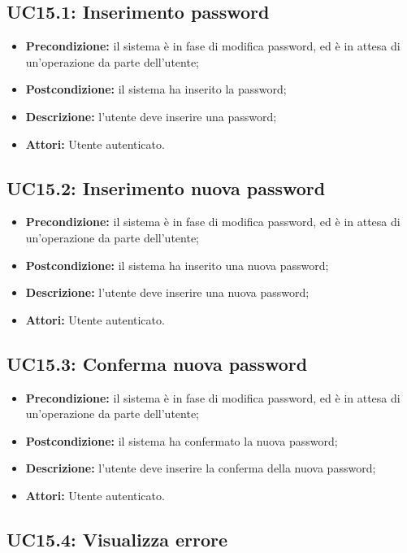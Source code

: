 \subsection{ UC15.1: Inserimento password}

\begin{itemize}
	\item \textbf{Precondizione:} il sistema è in fase di modifica password, ed è in attesa di un'operazione da parte dell'utente;
	\item \textbf{Postcondizione:} il sistema ha inserito la password;
	\item \textbf{Descrizione:} l'utente deve inserire una password;
	\item \textbf{Attori:} Utente autenticato.
\end{itemize}
\subsection{ UC15.2: Inserimento nuova password}

\begin{itemize}
	\item \textbf{Precondizione:} il sistema è in fase di modifica password, ed è in attesa di un'operazione da parte dell'utente;
	\item \textbf{Postcondizione:} il sistema ha inserito una nuova password;
	\item \textbf{Descrizione:} l'utente deve inserire una nuova password;
	\item \textbf{Attori:} Utente autenticato.
\end{itemize}
\subsection{ UC15.3: Conferma nuova password}

\begin{itemize}
	\item \textbf{Precondizione:} il sistema è in fase di modifica password, ed è in attesa di un'operazione da parte dell'utente;
	\item \textbf{Postcondizione:} il sistema ha confermato la nuova password;
	\item \textbf{Descrizione:} l'utente deve inserire la conferma della nuova password;
	\item \textbf{Attori:} Utente autenticato.
\end{itemize}
\subsection{ UC15.4: Visualizza errore}

